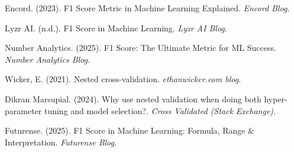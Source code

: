 \documentclass{article}
\begin{document}
\begin{thebibliography}{99}
    Encord. (2023). F1 Score Metric in Machine Learning Explained. \textit{Encord Blog}.

    Lyzr AI. (n.d.). F1 Score in Machine Learning. \textit{Lyzr AI Blog}.

    Number Analytics. (2025). F1 Score: The Ultimate Metric for ML Success. \textit{Number Analytics Blog}.

    Wicker, E. (2021). Nested cross-validation. \textit{ethanwicker.com blog}.

    Dikran Marsupial. (2024). Why use nested validation when doing both hyper-parameter tuning and model selection?. \textit{Cross Validated (Stack Exchange)}.

    Futurense. (2025). F1 Score in Machine Learning: Formula, Range \& Interpretation. \textit{Futurense Blog}.

\end{thebibliography}
\end{document}
